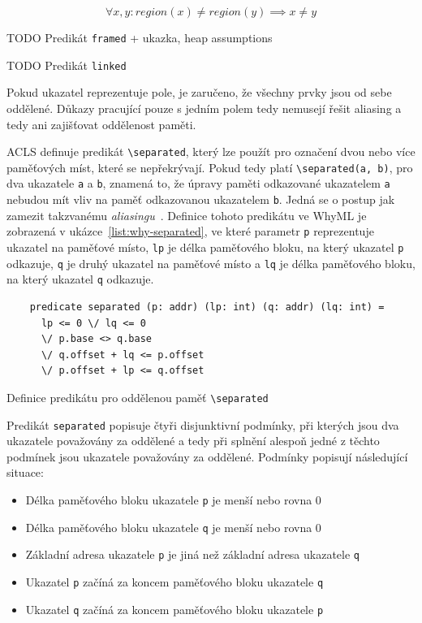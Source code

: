 \begin{equation*}
    \forall x, y : region(x) \neq region(y) \implies x \neq y
\end{equation*}

TODO Predikát \texttt{framed} + ukazka, heap assumptions

TODO Predikát \texttt{linked}

Pokud ukazatel reprezentuje pole,
je zaručeno, že všechny prvky jsou od sebe oddělené.
Důkazy pracující pouze s jedním polem tedy nemusejí řešit aliasing
a tedy ani zajišťovat oddělenost paměti.

ACLS definuje predikát \texttt{\textbackslash separated},
který lze použít pro označení dvou nebo více paměťových míst,
které se nepřekrývají.
Pokud tedy platí \texttt{\textbackslash separated(a, b)},
pro dva ukazatele \texttt{a} a \texttt{b},
znamená to, že úpravy paměti odkazované ukazatelem \texttt{a}
nebudou mít vliv na paměť odkazovanou ukazatelem \texttt{b}.
Jedná se o postup jak zamezit takzvanému \textit{aliasingu}~\cite{ACSLSpec}.
Definice tohoto predikátu ve WhyML je zobrazená v ukázce~\ref{list:why-separated},
ve které parametr \texttt{p} reprezentuje ukazatel na paměťové místo,
\texttt{lp} je délka paměťového bloku, na který ukazatel \texttt{p} odkazuje,
\texttt{q} je druhý ukazatel na paměťové místo a \texttt{lq} je délka paměťového bloku,
na který ukazatel \texttt{q} odkazuje.

\begin{listing}[H]
    \begin{verbatim}
    predicate separated (p: addr) (lp: int) (q: addr) (lq: int) =
      lp <= 0 \/ lq <= 0
      \/ p.base <> q.base
      \/ q.offset + lq <= p.offset
      \/ p.offset + lp <= q.offset
    \end{verbatim}
    \caption{Definice predikátu pro oddělenou paměť \texttt{\textbackslash separated}}
    \label{list:why-separated}
\end{listing}

Predikát \texttt{separated} popisuje čtyři disjunktivní podmínky,
při kterých jsou dva ukazatele považovány za oddělené
a tedy při splnění alespoň jedné z těchto podmínek
jsou ukazatele považovány za oddělené.
Podmínky popisují následující situace:

\begin{itemize}
    \item Délka paměťového bloku ukazatele \texttt{p} je menší nebo rovna 0
    \item Délka paměťového bloku ukazatele \texttt{q} je menší nebo rovna 0
    \item Základní adresa ukazatele \texttt{p} je jiná než základní adresa ukazatele \texttt{q}
    \item Ukazatel \texttt{p} začíná za koncem paměťového bloku ukazatele \texttt{q}
    \item Ukazatel \texttt{q} začíná za koncem paměťového bloku ukazatele \texttt{p}
\end{itemize}

